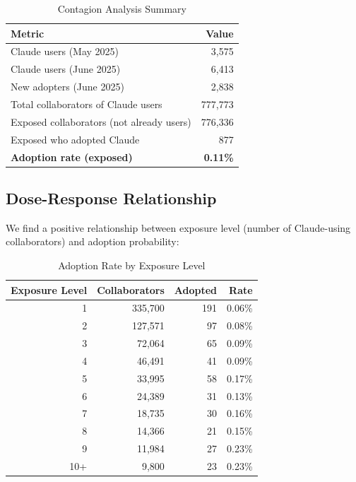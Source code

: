 \documentclass[11pt]{article}
\begin{document}
\begin{table}[H]
\centering
\caption{Contagion Analysis Summary}
\label{tab:summary}
\begin{tabular}{lr}
\toprule
\textbf{Metric} & \textbf{Value} \\
\midrule
Claude users (May 2025) & 3,575 \\
Claude users (June 2025) & 6,413 \\
New adopters (June 2025) & 2,838 \\
\midrule
Total collaborators of Claude users & 777,773 \\
Exposed collaborators (not already users) & 776,336 \\
Exposed who adopted Claude & 877 \\
\textbf{Adoption rate (exposed)} & \textbf{0.11\%} \\
\bottomrule
\end{tabular}
\end{table}

\subsection{Dose-Response Relationship}

We find a positive relationship between exposure level (number of Claude-using collaborators) and adoption probability:

\begin{table}[H]
\centering
\caption{Adoption Rate by Exposure Level}
\label{tab:exposure}
\begin{tabular}{rrrr}
\toprule
\textbf{Exposure Level} & \textbf{Collaborators} & \textbf{Adopted} & \textbf{Rate} \\
\midrule
1 & 335,700 & 191 & 0.06\% \\
2 & 127,571 & 97 & 0.08\% \\
3 & 72,064 & 65 & 0.09\% \\
4 & 46,491 & 41 & 0.09\% \\
5 & 33,995 & 58 & 0.17\% \\
6 & 24,389 & 31 & 0.13\% \\
7 & 18,735 & 30 & 0.16\% \\
8 & 14,366 & 21 & 0.15\% \\
9 & 11,984 & 27 & 0.23\% \\
10+ & 9,800 & 23 & 0.23\% \\
\bottomrule
\end{tabular}
\end{table}
\end{document}
